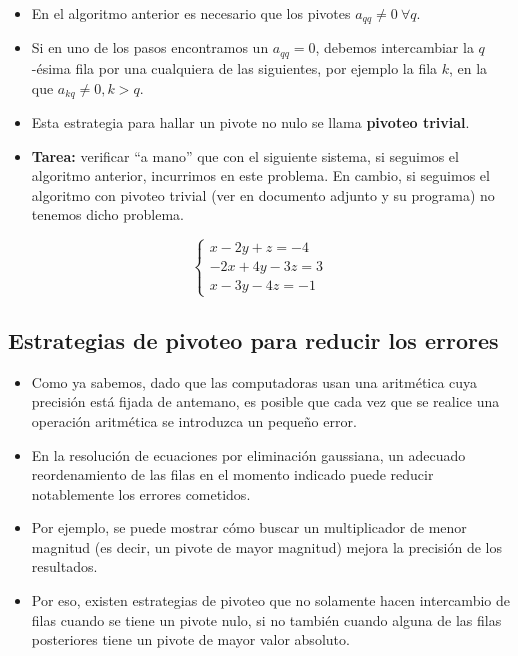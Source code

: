 \documentclass[openany]{book}
\providecommand{\tightlist}{%
  \setlength{\itemsep}{0pt}\setlength{\parskip}{0pt}}
\begin{document}
\begin{itemize}
\tightlist
\item
  En el algoritmo anterior es necesario que los pivotes \(a_{qq} \neq 0 ~\forall q\).
\item
  Si en uno de los pasos encontramos un \(a_{qq} = 0\), debemos intercambiar la \(q\)-ésima fila por una cualquiera de las siguientes, por ejemplo la fila \(k\), en la que \(a_{kq} \neq 0, k>q\).
\item
  Esta estrategia para hallar un pivote no nulo se llama \textbf{pivoteo trivial}.
\item
  \textbf{Tarea:} verificar ``a mano'' que con el siguiente sistema, si seguimos el algoritmo anterior, incurrimos en este problema. En cambio, si seguimos el algoritmo con pivoteo trivial (ver en documento adjunto y su programa) no tenemos dicho problema.
\end{itemize}

\[
\begin{cases} 
x-2y+z=-4 \\
-2x+4y-3z=3 \\
x-3y-4z=-1
\end{cases}
\]

\hypertarget{estrategias-de-pivoteo-para-reducir-los-errores}{%
\subsection{Estrategias de pivoteo para reducir los errores}\label{estrategias-de-pivoteo-para-reducir-los-errores}}

\begin{itemize}
\tightlist
\item
  Como ya sabemos, dado que las computadoras usan una aritmética cuya precisión está fijada de antemano, es posible que cada vez que se realice una operación aritmética se introduzca un pequeño error.
\item
  En la resolución de ecuaciones por eliminación gaussiana, un adecuado reordenamiento de las filas en el momento indicado puede reducir notablemente los errores cometidos.
\item
  Por ejemplo, se puede mostrar cómo buscar un multiplicador de menor magnitud (es decir, un pivote de mayor magnitud) mejora la precisión de los resultados.
\item
  Por eso, existen estrategias de pivoteo que no solamente hacen intercambio de filas cuando se tiene un pivote nulo, si no también cuando alguna de las filas posteriores tiene un pivote de mayor valor absoluto.
\end{itemize}
\end{document}
